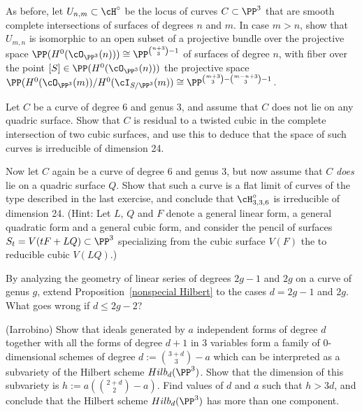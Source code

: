 \begin{exercise}\label{second complete intersection exercise}
As before, let $U_{n,m} \subset \cH^\circ$ be the locus of curves $C \subset \PP^3$ that are smooth complete intersections of surfaces of degrees $n$ and $m$.
 In case $m > n$, show that $U_{m,n}$ is isomorphic to an open subset of a projective bundle over the projective space $\PP(H^0(\cO_{\PP^3}(n))) \cong \PP^{\binom{n+3}{3}-1}$ of surfaces of degree $n$, with fiber over the point $[S] \in \PP(H^0(\cO_{\PP^3}(n)))$ the projective space $\PP(H^0(\cO_{\PP^3}(m))/H^0(\cI_{S/\PP^3}(m)) \cong \PP^{\binom{m+3}{3} - \binom{m-n+3}{3} - 1}$.
\end{exercise}

\begin{exercise}\label{6,3:1}
Let $C$ be a curve of degree 6 and genus 3, and assume that $C$ does not lie on any quadric surface. Show that $C$ is residual to a twisted cubic in the complete intersection of two cubic surfaces, and use this to deduce that the space of such curves is irreducible of dimension 24.
\end{exercise}


\begin{exercise}\label{6,3:2}
Now let $C$ again be a curve of degree 6 and genus 3, but now assume that $C$ \emph{does} lie on a quadric surface $Q$. Show that such a curve is a flat limit of curves of the type described in the last exercise, and conclude that $\cH^\circ_{3,3,6}$ is irreducible of dimension 24. (Hint: Let $L$, $Q$ and $F$ denote a general linear form, a general quadratic form and a general cubic form, and consider the pencil of surfaces $S_t = V(tF + LQ) \subset \PP^3$ specializing from the cubic surface $V(F)$ the to reducible cubic $V(LQ)$.)
\end{exercise}

\begin{exercise}
By analyzing the geometry of linear series of degrees $2g-1$ and $2g$ on a curve of genus $g$, extend Proposition~\ref{nonspecial Hilbert} to the cases $d = 2g-1$ and $2g$. What goes wrong if $d \leq 2g-2$?
\end{exercise}


\begin{exercise}\label{bigger component}(Iarrobino)
Show that ideals generated by $a$ independent forms of degree $d$ together with all the forms of degree $d+1$ in 3 variables
form a family of 0-dimensional schemes of degree $d:={3+d\choose 3} -a$ which can be interpreted as a subvariety
of the Hilbert scheme $Hilb_d(\PP^3)$. Show that the dimension of this subvariety is $h := a({2+d\choose 2}-a)$. Find values of
$d$ and $a$ such that $h>3d$, and conclude that the Hilbert scheme $Hilb_d(\PP^3)$ has more than one component.
\end{exercise}




